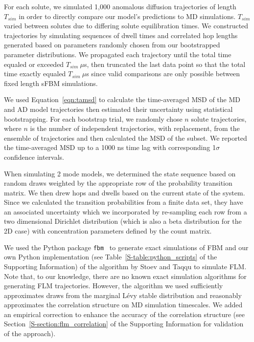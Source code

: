\documentclass[journal=ancac3,manuscript=article,layout=twocolumn]{achemso}
\begin{document}
  For each solute, we simulated 1,000 anomalous diffusion trajectories of
  length $T_{sim}$ in order to directly compare our model's predictions to MD
  simulations. $T_{sim}$ varied between solutes due to differing solute
  equilibration times. We constructed trajectories by simulating sequences of
  dwell times and correlated hop lengths generated based on parameters randomly
  chosen from our bootstrapped parameter distributions. We propagated each
  trajectory until the total time equaled or exceeded $T_{sim}~ \mu$s, then
  truncated the last data point so that the total time exactly equaled
  $T_{sim}~ \mu$s since valid comparisons are only possible between fixed
  length sFBM simulations. 
  
  We used Equation~\ref{eqn:tamsd} to calculate the time-averaged MSD of the MD
  and AD model trajectories then estimated their uncertainty using statistical
  bootstrapping. For each bootstrap trial, we randomly chose $n$ solute
  trajectories, where $n$ is the number of independent trajectories, with
  replacement, from the ensemble of trajectories and then calculated the MSD of
  the subset. We reported the time-averaged MSD up to a 1000 ns time lag with
  corresponding 1$\sigma$ confidence intervals. 

  When simulating 2 mode models, we determined the state sequence based on
  random draws weighted by the appropriate row of the probability transition
  matrix. We then drew hops and dwells based on the current state of the
  system. Since we calculated the transition probabilities from a finite data
  set, they have an associated uncertainty which we incorporated by re-sampling
  each row from a two dimensional Dirichlet distribution (which is also a beta
  distribution for the 2D case) with concentration parameters defined by the
  count matrix.~\cite{bacallado_bayesian_2009}
  
  We used the Python package \texttt{fbm}~\cite{flynn_exact_2019} to generate exact simulations of FBM
  and our own Python implementation (see Table~\ref{S-table:python_scripts} of
  the Supporting Information) of the algorithm by Stoev and Taqqu to
  simulate FLM.~\cite{stoev_simulation_2004} Note that, to our knowledge, there
  are no known exact simulation algorithms for generating FLM trajectories.
  However, the algorithm we used sufficiently approximates draws from the
  marginal L\'evy stable distribution and reasonably approximates the
  correlation structure on MD simulation timescales. We added an empirical
  correction to enhance the accuracy of the correlation structure (see
  Section~\ref{S-section:flm_correlation} of the Supporting Information for
  validation of the approach).
\end{document}
